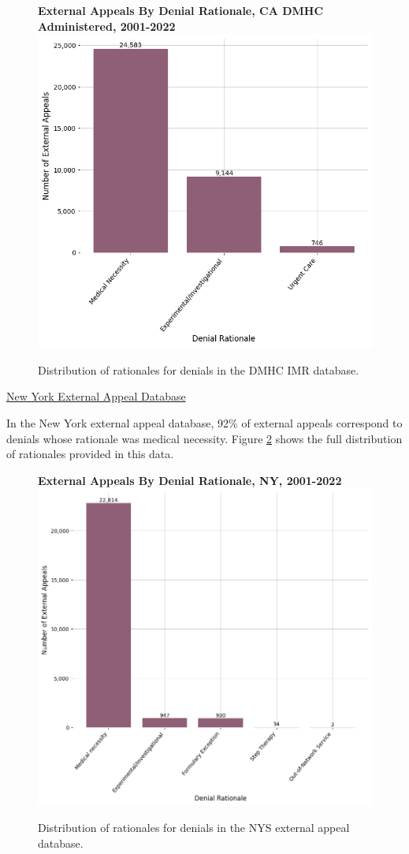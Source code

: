 \documentclass[12pt, a4paper,twoside]{report}
\theoremstyle{plain} %
\theoremstyle{definition} %
\theoremstyle{remark} %
\numberwithin{equation}{chapter}
\begin{document}
		\begin{figure}[h!]
			\centering
			\textbf{External Appeals By Denial Rationale, CA DMHC Administered, 2001-2022}
			\includegraphics[width=.8\textwidth]{images/ca_dmhc_external_appeals/external_appeals_by_denial_reason.png}
			\caption{Distribution of rationales for denials in the DMHC IMR database.}
			\label{cadmhceexternalappealsbyrationale}
		\end{figure}
	
	
		\underline{New York External Appeal Database}

		In the New York external appeal database, 92\% of external appeals correspond to denials whose rationale was medical necessity. Figure \ref{nyexternalappealsbyrationale} shows the full distribution of rationales provided in this data.
		
		\begin{figure}[h!]
			\centering
			\textbf{External Appeals By Denial Rationale, NY, 2001-2022}
			\includegraphics[width=.8\textwidth]{images/nys_external/external_appeals_by_denial_reason.png}
			\caption{Distribution of rationales for denials in the NYS external appeal database.}
			\label{nyexternalappealsbyrationale}
		\end{figure}
	
\end{document}
